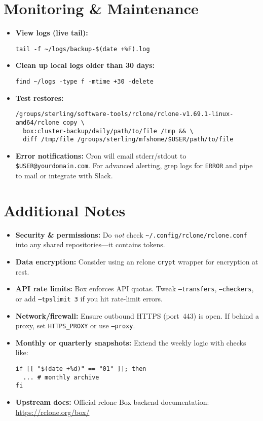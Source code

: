\documentclass[12pt,letterpaper]{article}
\begin{document}
\section{Monitoring \& Maintenance}
\begin{itemize}
  \item \textbf{View logs (live tail):}
    \begin{lstlisting}[style=custombash]
tail -f ~/logs/backup-$(date +%F).log
    \end{lstlisting}
  \item \textbf{Clean up local logs older than 30 days:}
    \begin{lstlisting}[style=custombash]
find ~/logs -type f -mtime +30 -delete
    \end{lstlisting}
  \item \textbf{Test restores:}
    \begin{lstlisting}[style=custombash]
/groups/sterling/software-tools/rclone/rclone-v1.69.1-linux-amd64/rclone copy \
  box:cluster-backup/daily/path/to/file /tmp && \
  diff /tmp/file /groups/sterling/mfshome/$USER/path/to/file
    \end{lstlisting}
  \item \textbf{Error notifications:} Cron will email stderr/stdout to \verb|$USER@yourdomain.com|. For advanced alerting, grep logs for \texttt{ERROR} and pipe to mail or integrate with Slack.
\end{itemize}

\section{Additional Notes}
\begin{itemize}
  \item \textbf{Security \& permissions:}
    Do \emph{not} check \verb|~/.config/rclone/rclone.conf| into any shared repositories—it contains tokens.
  \item \textbf{Data encryption:}
    Consider using an rclone \texttt{crypt} wrapper for encryption at rest.
  \item \textbf{API rate limits:}
    Box enforces API quotas. Tweak \texttt{--transfers}, \texttt{--checkers}, or add \texttt{--tpslimit 3} if you hit rate-limit errors.
  \item \textbf{Network/firewall:}
    Ensure outbound HTTPS (port~443) is open. If behind a proxy, set \verb|HTTPS_PROXY| or use \texttt{--proxy}.
  \item \textbf{Monthly or quarterly snapshots:}
    Extend the weekly logic with checks like:
    \begin{lstlisting}[style=custombash]
if [[ "$(date +%d)" == "01" ]]; then
  ... # monthly archive
fi
    \end{lstlisting}
  \item \textbf{Upstream docs:}
    Official rclone Box backend documentation:
    \href{https://rclone.org/box/}{https://rclone.org/box/}
\end{itemize}
\end{document}
